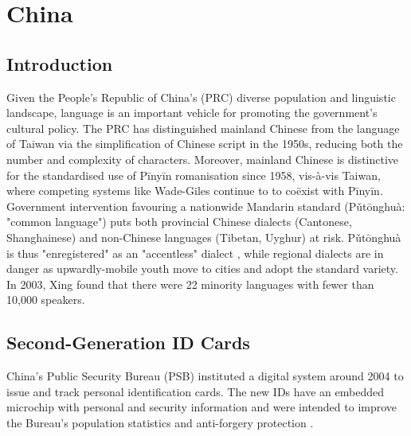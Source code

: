 \section{China}

\subsection{Introduction}

Given the People's Republic of China's (PRC) diverse population and linguistic
landscape, language is an important vehicle for promoting the government's
cultural policy. The PRC has distinguished mainland Chinese from the language of
Taiwan via the simplification of Chinese script in the 1950s, reducing both the
number and complexity of characters. Moreover, mainland Chinese is distinctive
for the standardised use of Pīnyīn romanisation since 1958, vis-à-vis Taiwan,
where competing systems like Wade-Giles continue to to coëxist with Pīnyīn.
Government intervention favouring a nationwide Mandarin standard (Pǔtōnghuà:
"common language") puts both provincial Chinese dialects (Cantonese,
Shanghainese) and non-Chinese languages (Tibetan, Uyghur) at risk. Pǔtōnghuà is
thus "enregistered" as an "accentless" dialect \parencite{dong10}, while
regional dialects are in danger as upwardly-mobile youth move to cities and
adopt the standard variety. In 2003, Xing found that there were 22 minority
languages with fewer than 10,000 speakers.

\subsection{Second-Generation ID Cards}

China's Public Security Bureau (PSB) instituted a digital system around 2004 to
issue and track personal identification cards. The new IDs have an embedded
microchip with personal and security information and were intended to improve
the Bureau's population statistics and anti-forgery protection
\parencite{ciicn04}.

